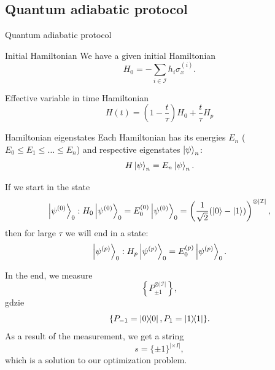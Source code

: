 \subsection{Quantum adiabatic protocol}
\begin{frame}[allowframebreaks]{Quantum adiabatic protocol}
\begin{block}{Initial Hamiltonian}
We have a given initial Hamiltonian
$$
H_0 = - \sum_{i\in \mathcal{I}} h_i \sigma_x^{(i)}.
$$
\end{block}

\begin{block}{Effective variable in time Hamiltonian}
$$
H(t) = (1 - \frac{t}{\tau}) H_0 + \frac{t}{\tau} H_p
$$
\end{block}

\framebreak
\begin{block}{Hamiltonian eigenstates}
Each Hamiltonian has its energies $E_n$ ($E_0 \leq E_1 \leq \ldots \leq E_n$) 
and respective eigenstates $\ket{\psi}_n$:
$$
H\ket{\psi}_n = E_n \ket{\psi}_n.
$$
\end{block}

If we start in the state
$$\ket{\psi^{(0)}}_0: H_0\ket{\psi^{(0)}}_0 = E_0^{(0)} \ket{\psi^{(0)}}_0 =
\left(\frac{1}{\sqrt{2}}(\ket{0}-\ket{1})\right)^{\otimes |\mathcal{I}|},
$$
then for large $\tau$ we will end in a state:
$$\ket{\psi^{(p)}}_0: H_p\ket{\psi^{(p)}}_0 = E_0^{(p)} \ket{\psi^{(p)}}_0.$$

\framebreak
In the end, we measure
$$\left\{P_{\pm 1}^{\otimes|\mathcal{I}|}\right\},$$ gdzie
$$\{P_{-1} = \ketbra{0}{0}, P_{1} = \ketbra{1}{1}\}.$$
As a result of the measurement, we get a string
$$s = \{\pm 1\}^{|\times{I}|},$$
which is a solution to our optimization problem.
\end{frame}
